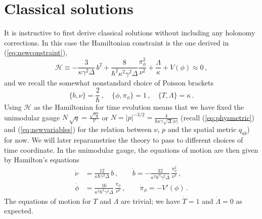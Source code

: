 \documentclass[aps,prd,11pt,showkeys,nofootinbib]{revtex4-2}
\begin{document}
\section{Classical solutions}
\label{classsol}

It is instructive to first derive classical solutions without including any holonomy corrections. In this case the Hamiltonian constraint is the one derived in (\ref{eq:newconstraint}),
\begin{equation}
   \mathcal{H} \equiv -\frac{3}{\kappa\gamma^2\Delta}\,b^2 +\frac{8}{\hbar^2\kappa^2\gamma^2 \Delta} \frac{\pi_\phi^2}{\nu^2}+ \frac{\Lambda}{\kappa} +V(\phi)\approx 0\,,
\end{equation}
and we recall the somewhat nonstandard choice of Poisson brackets
\begin{equation}
\{ b, \nu \} = \frac{2}{\hbar}\,,\quad \{ \phi,\pi_\phi\} = 1 \,, \quad \{T,\Lambda \}=\kappa\,.
\end{equation}
Using $\mathcal{H}$ as the Hamiltonian for time evolution means that we have fixed the unimodular gauge $N\,\sqrt{q}=\frac{\sqrt{{}^0 q}}{\mathcal{V}}$ or $N=|p|^{-3/2}=\frac{4}{\hbar\kappa\gamma\sqrt{\Delta}|\nu|}$ (recall (\ref{eq:physmetric}) and (\ref{eq:newvariables}) for the relation between $\nu$, $p$ and the spatial metric $q_{ab}$) for now. We will later reparametrise the theory to pass to different choices of time coordinate. In the unimodular gauge, the equations of motion are then given by Hamilton's equations
\begin{align}
    \dot \nu &= \frac{12}{\kappa \hbar\gamma^2\Delta}\, b\,,\qquad
    \dot b = -\frac{32}{\kappa^2 \hbar^3 \gamma^2 \Delta}\,\frac{\pi_\phi^2}{\nu^3}\,,\\
    \dot \phi &= \frac{16}{\kappa^2 \hbar^2 \gamma^2 \Delta}\,\frac{\pi_\phi}{\nu^2}\,, \qquad     \dot \pi_\phi = -V'(\phi)\, .
\end{align}
The equations of motion for $T$ and $\Lambda$ are trivial; we have $\dot{T}=1$ and $\dot\Lambda=0$ as expected.
\end{document}
